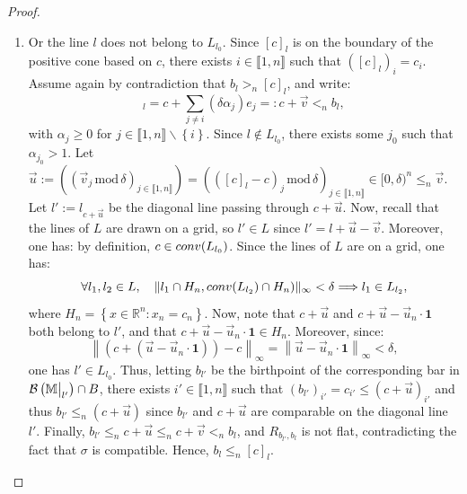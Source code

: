 \documentclass{article}
\newcommand{\norm}[1]{\left\lVert #1 \right\rVert}
\newcommand{\barcode}[1]{ {\mathcal B}\left(#1\right) }
\newcommand{\conv}[1]{ {\rm conv}(#1) }
\newcommand{\Mbb}{\mathbb{M}}
\newcommand{\leqn}{\leq_n}
\newcommand{\sln}{<_n}
\newcommand{\sgn}{>_n}
\newcommand{\rectangle}[2]{ R_{#1, #2} }
\newcommand\restr[2]{{  \left.\kern-\nulldelimiterspace #1 \vphantom{\big|} \right|_{#2}  }}
\DeclareRobustCommand*{\ora}{\overrightarrow}
\newcommand{\birthptapprox}{b_l}
\begin{document}
\begin{proof}
\begin{enumerate}
\begin{enumerate}
				\item Or the line $l$ does not belong to $L_{l_0}$. Since $[c]_l$ is on the boundary of the positive cone based on $c$, there exists
					$ i \in \llbracket 1,n \rrbracket$ such that
					$ ([c]_l)_i = c_i$. %
					Assume again by contradiction that $\birthptapprox \sgn [c]_l$,
					and write:
					\begin{equation*}
						[c]_l = c + \sum_{j\neq i} (\delta \alpha_j) e_j =: c +  \ora v \sln \birthptapprox,
					\end{equation*}
					with $ \alpha_j \ge 0$ for $j \in \llbracket 1,n \rrbracket \backslash \left\{ i\right\}$.
					Since $l \notin L_{l_0}$, there exists some $j_0$ such that $ \alpha_{j_0} >1$. %
					Let
					$\overrightarrow u := ((\overrightarrow v_j\, \mathrm{ mod}\, \delta)_{j\in \llbracket 1,n\rrbracket}) =
					( ([c]_l - c)_j\, \mathrm{ mod}\, \delta)_{j\in \llbracket 1,n\rrbracket} \in [0,\delta)^n \leqn \ora v$. %
					Let $l':=l_{c+\ora u}$ be the diagonal line passing through $c+\ora u$.
					Now, recall that the lines of $L$ are drawn on a grid, %
					so $l'\in L$
					since $l' = l + \ora u - \ora v$.
					Moreover, one has:
					by definition,
					$c\in \conv{L_{l_0}}$.
					Since the lines of $L$ are on a grid, one has:
					\begin{equation*}
						\forall l_1,l_2 \in L,\quad
					\Vert l_1 \cap H_n, \conv{L_{l_2}} \cap H_n)\Vert_\infty < \delta  \Longrightarrow l_1 \in L_{l_2},
				\end{equation*}
				where
				$H_n = \left\{ x\in \mathbb R^n : x_n = c_n \right\}$.
				Now,  note that $c+ \ora u$ and $c + \ora u -\ora u_n\cdot \textbf{1}$ both belong to $l'$, and that $c + \ora u -\ora u_n\cdot \textbf{1} \in H_n$. Moreover, since:
				$$\norm{ (c + (\ora u -\ora u_n\cdot \textbf{1})) - c}_\infty =  \norm{ \ora u -\ora u_n\cdot \textbf{1}}_{\infty} < \delta,$$
				one has $l'\in L_{l_0}$.
				Thus, {letting $b_{l'}$ be the birthpoint of the corresponding bar
				in $\barcode{\restr{\Mbb}{l'}} \cap B$}, there exists $ i'\in \llbracket 1,n\rrbracket$ such that $(b_{l'})_{i'} = c_{i'} \leq (c+\overrightarrow u)_{i'}$
				and thus $b_{l'} \leqn (c+\overrightarrow u)$ since $b_{l'}$ and $c+ \overrightarrow u$ are comparable on the diagonal line $l'$. Finally,
				$b_{l'} \leqn c+ \overrightarrow u \leqn c+ \overrightarrow v \sln \birthptapprox$,
				and $\rectangle{b_{l'}}{\birthptapprox}$ is not flat, contradicting
				the fact that $\sigma$ is compatible.
				Hence, $\birthptapprox\leqn [c]_l$.


\end{enumerate}
\end{enumerate}
\end{proof}
\end{document}
